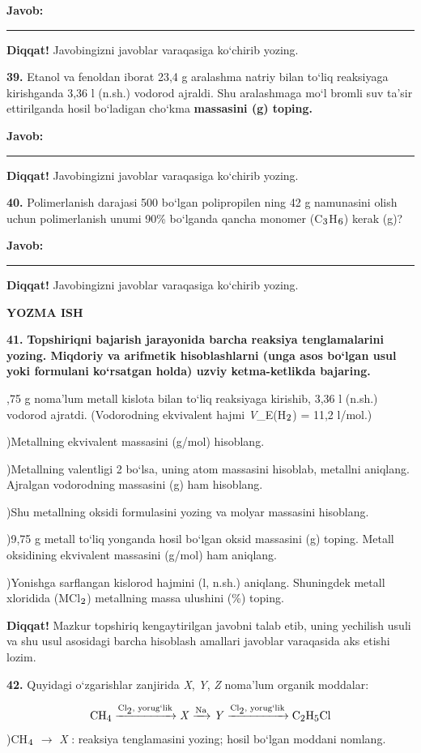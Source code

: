 \documentclass[11pt,a4paper]{article}
\renewcommand{\textsubscript}[1]{\ensuremath{_{\text{\fontsize{8}{8}\selectfont #1}}}}
\newcommand{\diqqat}[1]{\par\smallskip\noindent\textbf{Diqqat!} #1\par\medskip}
\newcommand{\javob}{\par\smallskip\noindent\textbf{Javob:} \rule[-2pt]{7.5cm}{0.4pt}\par\smallskip\noindent\textbf{Diqqat!} Javobingizni javoblar varaqasiga ko`chirib yozing.\par\medskip}
\begin{document}
\javob
\noindent\textbf{39.} Etanol va fenoldan iborat 23,4 g aralashma natriy bilan to`liq reaksiyaga kirishganda 3,36 l (n.sh.) vodorod ajraldi. Shu aralashmaga mo`l bromli suv ta'sir ettirilganda hosil bo`ladigan cho`kma \textbf{massasini (g) toping.}
\javob
\noindent\textbf{40.} Polimerlanish darajasi 500 bo`lgan polipropilen ning 42 g namunasini olish uchun polimerlanish unumi 90\% bo`lganda qancha monomer (C\textsubscript{3}H\textsubscript{6}) kerak (g)?
\javob
\par\bigskip\begin{center}\textbf{\fontsize{13}{15}\selectfont YOZMA ISH}\end{center}
\noindent\textbf{41.} \textbf{Topshiriqni bajarish jarayonida barcha reaksiya tenglamalarini yozing. Miqdoriy va arifmetik hisoblashlarni (unga asos bo`lgan usul yoki formulani ko`rsatgan holda) uzviy ketma-ketlikda bajaring.}\par{},75 g noma'lum metall kislota bilan to`liq reaksiyaga kirishib, 3,36 l (n.sh.) vodorod ajratdi. (Vodorodning ekvivalent hajmi \textit{V}\_E(H\textsubscript{2}) = 11,2 l/mol.)\par
{})Metallning ekvivalent massasini (g/mol) hisoblang.\par
{})Metallning valentligi 2 bo`lsa, uning atom massasini hisoblab, metallni aniqlang. Ajralgan vodorodning massasini (g) ham hisoblang.\par
{})Shu metallning oksidi formulasini yozing va molyar massasini hisoblang.\par
{})9,75 g metall to`liq yonganda hosil bo`lgan oksid massasini (g) toping. Metall oksidining ekvivalent massasini (g/mol) ham aniqlang.\par
{})Yonishga sarflangan kislorod hajmini (l, n.sh.) aniqlang. Shuningdek metall xloridida (MCl\textsubscript{2}) metallning massa ulushini (\%) toping.\par
\diqqat{Mazkur topshiriq kengaytirilgan javobni talab etib, uning yechilish usuli va shu usul asosidagi barcha hisoblash amallari javoblar varaqasida aks etishi lozim.}
\noindent\textbf{42.} Quyidagi o`zgarishlar zanjirida \textit{X}, \textit{Y}, \textit{Z} noma'lum organik moddalar:\par
\[\setlength{\fboxsep}{0pt}\text{CH\textsubscript{4}}\xrightarrow{\text{Cl\textsubscript{2}, yorug`lik}}\text{\textit{X}}\xrightarrow{\text{Na}}\text{\textit{Y}}\xrightarrow{\text{Cl\textsubscript{2}, yorug`lik}}\text{C\textsubscript{2}H\textsubscript{5}Cl}\]
)CH\textsubscript{4} $\to$ \textit{X} : reaksiya tenglamasini yozing; hosil bo`lgan moddani nomlang.\par
\end{document}
